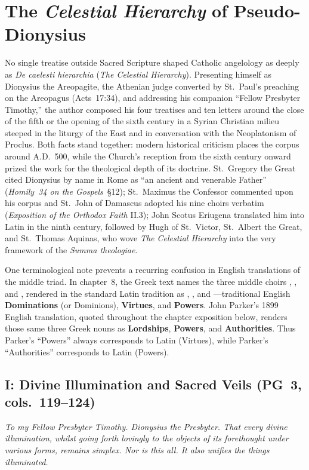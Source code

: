 \section{The \emph{Celestial Hierarchy} of Pseudo-Dionysius}
\label{sec:celestial-hierarchy}

No single treatise outside Sacred Scripture shaped Catholic angelology as deeply as \emph{De caelesti hierarchia} (\emph{The Celestial Hierarchy}). Presenting himself as Dionysius the Areopagite, the Athenian judge converted by St.~Paul's preaching on the Areopagus (Acts~17:34), and addressing his companion ``Fellow Presbyter Timothy,'' the author composed his four treatises and ten letters around the close of the fifth or the opening of the sixth century in a Syrian Christian milieu steeped in the liturgy of the East and in conversation with the Neoplatonism of Proclus. Both facts stand together: modern historical criticism places the corpus around A.D.~500, while the Church's reception from the sixth century onward prized the work for the theological depth of its doctrine. St.~Gregory the Great cited Dionysius by name in Rome as ``an ancient and venerable Father'' (\emph{Homily~34 on the Gospels}~\S 12); St.~Maximus the Confessor commented upon his corpus and St.~John of Damascus adopted his nine choirs verbatim (\emph{Exposition of the Orthodox Faith} II.3); John Scotus Eriugena translated him into Latin in the ninth century, followed by Hugh of St.~Victor, St.~Albert the Great, and St.~Thomas Aquinas, who wove \emph{The Celestial Hierarchy} into the very framework of the \emph{Summa theologiae}.

One terminological note prevents a recurring confusion in English translations of the middle triad. In chapter~8, the Greek text names the three middle choirs , , and , rendered in the standard Latin tradition as , , and ---traditional English \textbf{Dominations} (or Dominions), \textbf{Virtues}, and \textbf{Powers}. John Parker's 1899 English translation, quoted throughout the chapter exposition below, renders those same three Greek nouns as \textbf{Lordships}, \textbf{Powers}, and \textbf{Authorities}. Thus Parker's ``Powers'' always corresponds to Latin  (Virtues), while Parker's ``Authorities'' corresponds to Latin  (Powers).

\subsection{I: Divine Illumination and Sacred Veils (PG~3, cols.~119--124)}
\label{sec:ch-i}
\emph{To my Fellow Presbyter Timothy. Dionysius the Presbyter. That every divine illumination, whilst going forth lovingly to the objects of its forethought under various forms, remains simplex. Nor is this all. It also unifies the things illuminated.}

